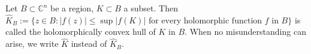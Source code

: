 Let $B \subset \mathbb{C}^n$ be a region, $K \subset B$ a subset. Then $\hat{K}_B := \{ z \in B : |f(z)| \leq \sup|f(K)| \text{ for every holomorphic function } f \text{ in } B \}$ is called the holomorphically convex hull of $K$ in $B$. When no misunderstanding can arise, we write $\hat{K}$ instead of $\hat{K}_B$.
